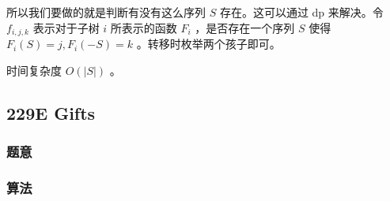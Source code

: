 \documentclass[11pt]{article}
\begin{document}
所以我们要做的就是判断有没有这么序列 $S$ 存在。这可以通过 dp 来解决。令 $f_{i, j, k}$ 表示对于子树 $i$ 所表示的函数 $F_i$ ，是否存在一个序列 $S$ 使得 $F_i (S) = j, F_i (-S) = k$ 。转移时枚举两个孩子即可。

时间复杂度 $O(|S|)$ 。
\subsection{229E  Gifts}
\label{sec-12-9}
\subsubsection{题意}
\label{sec-12-9-1}
\subsubsection{算法}
\label{sec-12-9-2}
\end{document}
